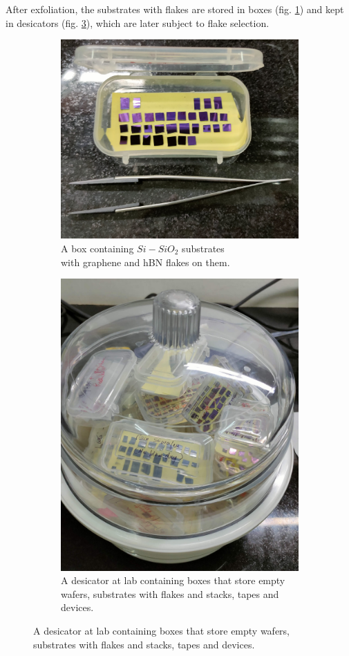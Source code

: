 After exfoliation, the substrates with flakes are stored in boxes (fig. \ref{fig:box}) and kept in desicators (fig. \ref{fig:des}), which are later subject to flake selection.

\begin{figure}[H]
	\centering
	\begin{subfigure}{.5\linewidth}
		\centering
		\includegraphics[width=.8\linewidth]{figures/box}
		\caption{A box containing $Si-SiO_2$ substrates \\ with graphene and hBN flakes on them.}
		\label{fig:box}
	\end{subfigure}%
	\begin{subfigure}{.5\linewidth}
		\centering
		\includegraphics[width=.6\linewidth]{figures/des}
		\caption{A desicator at lab containing boxes that store empty wafers, substrates with flakes and stacks, tapes and devices.}
		\label{fig:des}
	\end{subfigure}
\end{figure}

